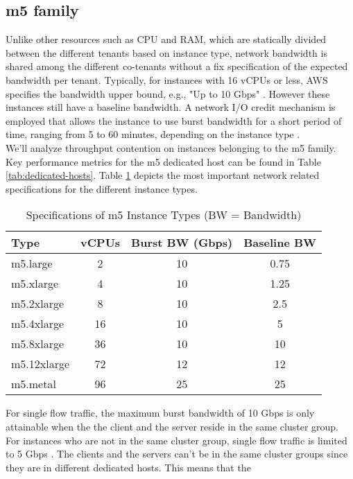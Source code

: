 \subsection{m5 family}
Unlike other resources such as CPU and RAM, which are statically divided between the different tenants 
based on instance type, network bandwidth is shared among the different co-tenants without a fix
specification of the expected bandwidth per tenant. Typically, for instances with 16 vCPUs or less, 
AWS specifies the bandwidth upper bound, e.g., "Up to 10 Gbps" \cite{network_bandwidth}. However these 
instances still have a baseline bandwidth. A network I/O credit mechanism is employed that 
allows the instance to use burst bandwidth for a short period of time, ranging from 5 to 60 minutes,
depending on the instance type \cite{network_bandwidth}. \\ 
We'll analyze throughput contention on instances belonging to the m5 family. Key
performance metrics for the m5 dedicated host can be found in Table \ref{tab:dedicated-hosts}.
Table \ref{tab:m5_spec} depicts the most important network related specifications for the different 
instance types.
\begin{table}[H]
\centering
\begin{tabular}{lccc}
\toprule
\textbf{Type} & \textbf{vCPUs} & \textbf{Burst BW (Gbps) \cite{cloudspecs}} & \textbf{Baseline BW \cite{cloudspecs}} \\
\midrule
m5.large     & 2  & 10 & 0.75 \\
m5.xlarge    & 4  & 10 & 1.25 \\
m5.2xlarge   & 8  & 10 & 2.5  \\
m5.4xlarge   & 16 & 10 & 5    \\
m5.8xlarge   & 36 & 10 & 10   \\
m5.12xlarge  & 72 & 12 & 12   \\
m5.metal     & 96 & 25 & 25   \\
\bottomrule
\end{tabular}
\caption{Specifications of m5 Instance Types (BW = Bandwidth)}
\label{tab:m5_spec}
\end{table}
\noindent
For single flow traffic, the maximum burst bandwidth of 10 Gbps is only attainable when the the client and 
the server reside in the same cluster group. For instances who are not in the same cluster group, single flow 
traffic is limited to 5 Gbps \cite{network_bandwidth}.  The clients and the servers 
can't be in the same cluster groups since they are in different dedicated hosts. This means that the 
